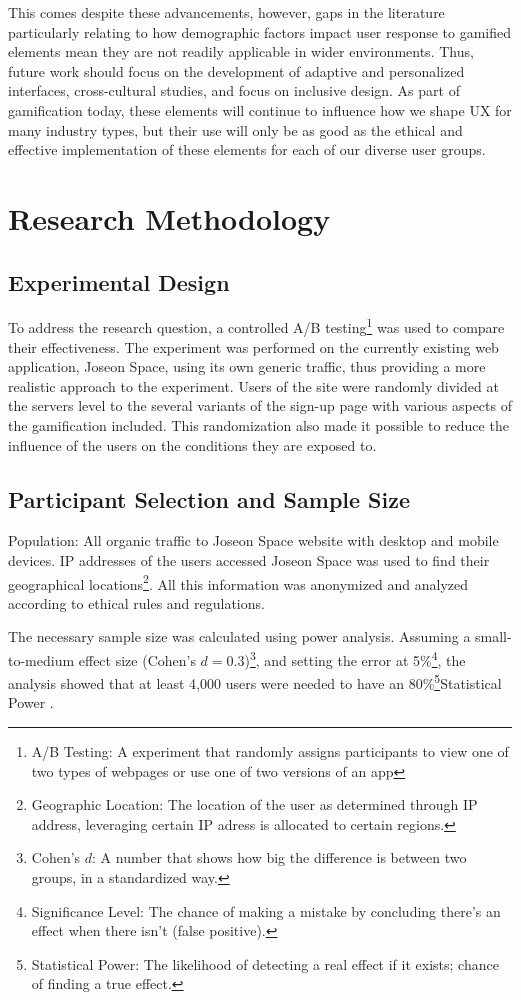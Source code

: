 \documentclass[conference]{IEEEtran}
\begin{document}
This comes despite these advancements, however, gaps in the literature particularly relating to how demographic factors impact user response to gamified elements mean they are not readily applicable in wider environments. Thus, future work should focus on the development of adaptive and personalized interfaces, cross-cultural studies, and focus on inclusive design. As part of gamification today, these elements will continue to influence how we shape UX for many industry types, but their use will only be as good as the ethical and effective implementation of these elements for each of our diverse user groups.

\section{Research Methodology}

\subsection{Experimental Design}

To address the research question, a controlled A/B testing\footnote{A/B Testing: A experiment that randomly assigns participants to view one of two types of webpages or use one of two versions of an app} was used to compare their effectiveness. The experiment was performed on the currently existing web application, Joseon Space, using its own generic traffic, thus providing a more realistic approach to the experiment. Users of the site were randomly divided at the servers level to the several variants of the sign-up page with various aspects of the gamification included. This randomization also made it possible to reduce the influence of the users on the conditions they are exposed to.

\subsection{Participant Selection and Sample Size}
Population: All organic traffic to Joseon Space website with desktop and mobile devices. IP addresses of the users accessed Joseon Space was used to find their geographical locations\footnote{Geographic Location: The location of the user as determined through IP address, leveraging certain IP adress is allocated to certain regions.}. All this information was anonymized and analyzed according to ethical rules and regulations.

The necessary sample size was calculated using power analysis. Assuming a small-to-medium effect size (Cohen’s $d = 0.3$)\footnote{Cohen’s $d$: A number that shows how big the difference is between two groups, in a standardized way.}, and setting the error at 5\%\footnote{Significance Level: The chance of making a mistake by concluding there’s an effect when there isn’t (false positive).}, the analysis showed that at least 4,000 users were needed to have an 80\%\footnote{Statistical Power: The likelihood of detecting a real effect if it exists; chance of finding a true effect.}Statistical Power \cite{poweranalysis}.
\end{document}
